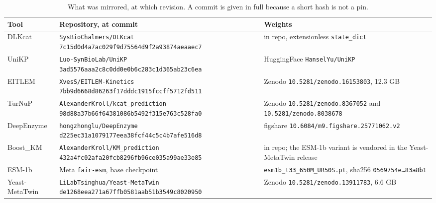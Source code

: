 \begin{table}[!htbp]
  \centering
  \footnotesize
  \caption[Code repositories and weight archives]{What was mirrored, at which revision.
  A commit is given in full because a short hash is not a pin.}
  \label{tab:code}
  \begin{tabular}{@{}p{}p{}p{}@{}}
    \hline
    Tool & Repository, at commit & Weights \\
    \hline
    DLKcat & \texttt{SysBioChalmers/DLKcat} \newline
      \texttt{7c15d0d4a7ac029f9d75564d9f2a93874aeaaec7} & in repo, extensionless
      \texttt{state\_dict} \\
    UniKP & \texttt{Luo-SynBioLab/UniKP} \newline
      \texttt{3ad5576aaa2c8c0dd0e0b6c283c1d365ab23c6ea} &
      HuggingFace \texttt{HanselYu/UniKP} \\
    EITLEM & \texttt{XvesS/EITLEM-Kinetics} \newline
      \texttt{7bb9d6668d86263f17dddc1915fccff5712fd511} &
      Zenodo \texttt{10.5281/zenodo.16153803}, 12.3 GB \\
    TurNuP & \texttt{AlexanderKroll/kcat\_prediction} \newline
      \texttt{98d88a37b66f64381086b5492f315e763c528fa0} &
      Zenodo \texttt{10.5281/zenodo.8367052} and
      \texttt{10.5281/zenodo.8038678} \\
    DeepEnzyme & \texttt{hongzhonglu/DeepEnzyme} \newline
      \texttt{d225ec31a1079177eea38fcf44c5c4b7afe516d8} &
      figshare \texttt{10.6084/m9.figshare.25771062.v2} \\
    Boost\_KM & \texttt{AlexanderKroll/KM\_prediction} \newline
      \texttt{432a4fc02afa20fcb8296fb96ce035a99ae33e85} &
      in repo; the ESM-1b variant is vendored in the Yeast-MetaTwin release \\
    ESM-1b & Meta \texttt{fair-esm}, base checkpoint &
      \texttt{esm1b\_t33\_650M\_UR50S.pt}, sha256 \texttt{0569754e\ldots83a8b1} \\
    Yeast-MetaTwin & \texttt{LiLabTsinghua/Yeast-MetaTwin} \newline
      \texttt{de1268eea271a67ffb0581aab51b3549c8020950} &
      Zenodo \texttt{10.5281/zenodo.13911783}, 6.6 GB \\
    \hline
  \end{tabular}
\end{table}

